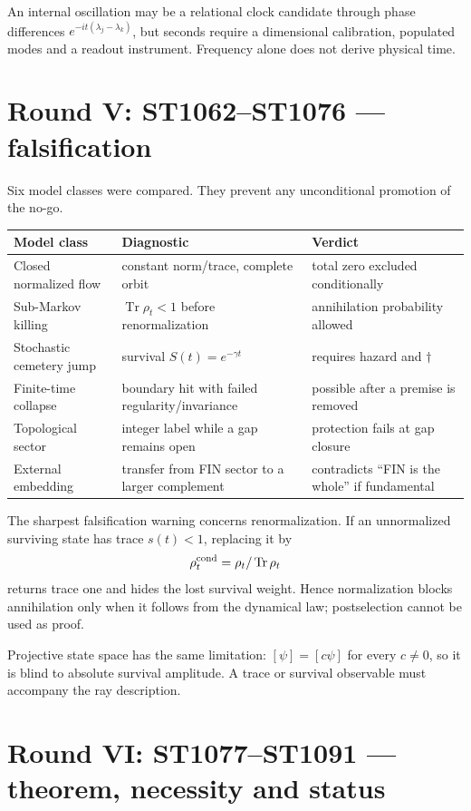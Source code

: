 \documentclass[11pt,a4paper]{article}
\newcommand{\nothingstate}{\dagger}
\begin{document}
An internal oscillation may be a relational clock candidate through phase
differences $e^{-it(\lambda_j-\lambda_k)}$, but seconds require a dimensional
calibration, populated modes and a readout instrument.  Frequency alone does
not derive physical time.

\section{Round V: ST1062--ST1076 --- falsification}

Six model classes were compared.  They prevent any unconditional promotion of
the no-go.

\begin{longtable}{@{}p{}p{}p{}@{}}
\toprule
Model class & Diagnostic & Verdict \\
\midrule\endhead
Closed normalized flow & constant norm/trace, complete orbit & total zero excluded conditionally \\
Sub-Markov killing & $\operatorname{Tr}\rho_t<1$ before renormalization & annihilation probability allowed \\
Stochastic cemetery jump & survival $S(t)=e^{-\gamma t}$ & requires hazard and $\nothingstate$ \\
Finite-time collapse & boundary hit with failed regularity/invariance & possible after a premise is removed \\
Topological sector & integer label while a gap remains open & protection fails at gap closure \\
External embedding & transfer from FIN sector to a larger complement & contradicts ``FIN is the whole'' if fundamental \\
\bottomrule
\end{longtable}

The sharpest falsification warning concerns renormalization.  If an
unnormalized surviving state has trace $s(t)<1$, replacing it by
\[
 \rho_t^{\rm cond}=\rho_t/\operatorname{Tr}\rho_t
\]
returns trace one and hides the lost survival weight.  Hence normalization
blocks annihilation only when it follows from the dynamical law; postselection
cannot be used as proof.

Projective state space has the same limitation: $[\psi]=[c\psi]$ for every
$c\ne0$, so it is blind to absolute survival amplitude.  A trace or survival
observable must accompany the ray description.

\section{Round VI: ST1077--ST1091 --- theorem, necessity and status}
\end{document}
